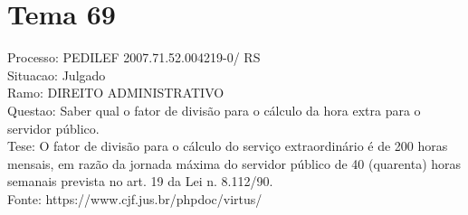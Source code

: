 \documentclass[12pt]{article}
\begin{document}
\section*{Tema 69}
Processo: PEDILEF 2007.71.52.004219-0/ RS\\
Situacao: Julgado\\
Ramo: DIREITO ADMINISTRATIVO\\
Questao: Saber qual o fator de divisão para o cálculo da hora extra para o servidor público.\\
Tese: O fator de divisão para o cálculo do serviço extraordinário é de 200 horas mensais, em razão da jornada máxima do servidor público de 40 (quarenta) horas semanais prevista no art. 19 da Lei n. 8.112/90.\\
Fonte: https://www.cjf.jus.br/phpdoc/virtus/
\end{document}
